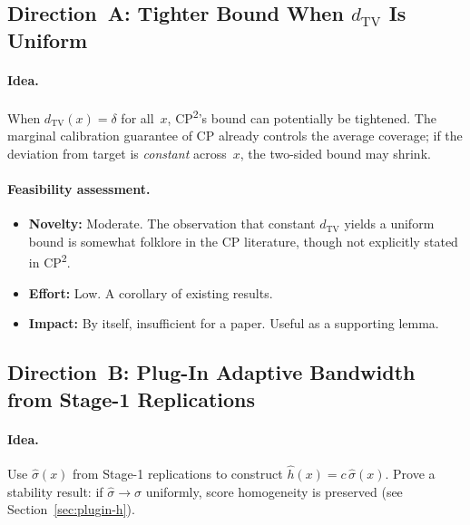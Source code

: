 \documentclass[11pt]{article}
\begin{document}
\subsection{Direction~A: Tighter Bound When $d_{\mathrm{TV}}$ Is Uniform}

\paragraph{Idea.}
When $d_{\mathrm{TV}}(x) = \delta$ for all~$x$,
CP\textsuperscript{2}'s bound can potentially be tightened. The
marginal calibration guarantee of CP already controls the average
coverage; if the deviation from target is \emph{constant} across~$x$,
the two-sided bound may shrink.

\paragraph{Feasibility assessment.}
\begin{itemize}
  \item \textbf{Novelty:} Moderate. The observation that constant
    $d_{\mathrm{TV}}$ yields a uniform bound is somewhat folklore in
    the CP literature, though not explicitly stated in
    CP\textsuperscript{2}.
  \item \textbf{Effort:} Low. A corollary of existing results.
  \item \textbf{Impact:} By itself, insufficient for a paper. Useful
    as a supporting lemma.
\end{itemize}

\subsection{Direction~B: Plug-In Adaptive Bandwidth from Stage-1 Replications}

\paragraph{Idea.}
Use $\hat\sigma(x)$ from Stage-1 replications to construct
$\hat h(x) = c\,\hat\sigma(x)$. Prove a stability result: if
$\hat\sigma \to \sigma$ uniformly, score homogeneity is preserved
(see Section~\ref{sec:plugin-h}).
\end{document}

